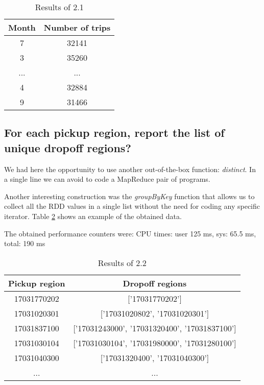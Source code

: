 \documentclass[conference,compsoc]{IEEEtran}
\begin{document}
\begin{table}[!t]
\renewcommand{\arraystretch}{1.3}
\caption{Results of 2.1}
\label{output_2_1}
\centering
\begin{tabular}{c||c}
\hline
\bfseries Month & \bfseries Number of trips\\
\hline\hline

7 &32141\\
3 &35260\\
... & ...\\
4 &32884\\
9 &31466\\
\hline
\end{tabular}
\end{table}

\subsection{For each pickup region, report the list of unique dropoff regions?}
We had here the opportunity to use another out-of-the-box function: \textit{distinct}. In a single line we can avoid to code a MapReduce pair of programs. \par Another interesting construction was the \textit{groupByKey} function that allows us to collect all the RDD values in a single list without the need for coding any specific iterator.  Table \ref{output_2_2} shows an example of the obtained data.  \par
The obtained performance counters were: CPU times: user 125 ms, sys: 65.5 ms, total: 190 ms

\begin{table}[!t]
\renewcommand{\arraystretch}{1.3}
\caption{Results of 2.2}
\label{output_2_2}
\centering
\begin{tabular}{c||c}
\hline
\bfseries Pickup region & \bfseries Dropoff regions\\
\hline\hline

17031770202 &['17031770202']\\
17031020301 &['17031020802', '17031020301']\\
17031837100 &['17031243000', '17031320400', '17031837100']\\
17031030104 &['17031030104', '17031980000', '17031280100']\\
17031040300 &['17031320400', '17031040300']\\
... &...\\
\hline
\end{tabular}
\end{table}
\end{document}
